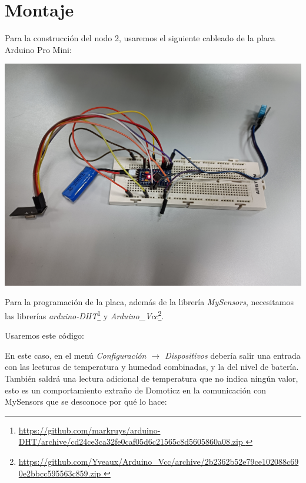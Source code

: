 \section{Montaje}

Para la construcción del nodo 2, usaremos el siguiente cableado de la placa
Arduino Pro Mini:

\includegraphics[width=\linewidth]{nodo2/nodo2-wiring.jpg}

Para la programación de la placa, además de la librería \emph{MySensors},
necesitamos las librerías \emph{arduino-DHT}\footnote{\url{
    https://github.com/markruys/arduino-DHT/archive/cd24ce3ca32fe0caf05d6c21565c8d5605860a08.zip
}} y \emph{Arduino\_Vcc}\footnote{\url{
    https://github.com/Yveaux/Arduino_Vcc/archive/2b2362b52e79ce102088c690e2bbcc595563c859.zip
}}.

Usaremos este código:



En este caso, en el menú \emph{Configuración $\rightarrow$ Dispositivos}
debería salir una entrada con las lecturas de temperatura y humedad combinadas,
y la del nivel de batería. También saldrá una lectura adicional de temperatura
que no indica ningún valor, esto es un comportamiento extraño de Domoticz en la
comunicación con MySensors que se desconoce por qué lo hace:

